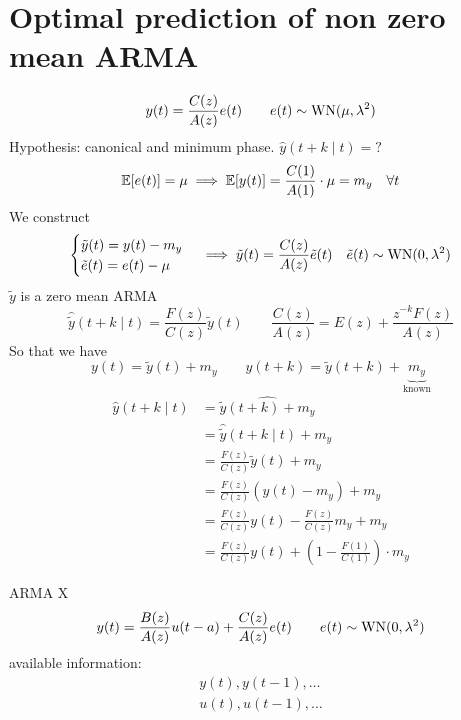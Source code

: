 \section{Optimal prediction of non zero mean ARMA}
\[
	y(t)=\frac{C(z)}{A(z)}e(t)\qquad e(t)\sim \operatorname{WN}(\mu,\lambda^2 )
\]
Hypothesis: canonical and minimum phase.
$\hat y(t+k\mid t)=?$
\[
	\mathbb{E}[e(t)]=\mu \implies \mathbb{E}[y(t)]=\frac{C(1)}{A(1)}\cdot\mu=m_{y} \quad \forall t
\]
We construct
\[
	\begin{cases}
		\tilde y(t)=y(t)-m_{y}\\
		\tilde e(t)=e(t)-\mu
	\end{cases}
	\implies 
	\tilde y(t)=\frac{C(z)}{A(z)}\tilde e(t) \quad \tilde e(t)\sim \operatorname{WN}(0,\lambda^2)
\]
$\tilde y$ is a zero mean ARMA
\[
	\hat{\tilde y} (t+k\mid t) = \frac{F(z)}{C(z)}\tilde y(t) \qquad \frac{C(z)}{A(z)}=E(z)+\frac{z^{-k}F(z) }{A(z)}
\]
So that we have
\[
	y(t)=\tilde y(t)+m_{y} \qquad y(t+k)=\tilde y(t+k)+\underbrace{m_{y}}_{\text{known}}
\]
\begin{align*}
	\hat y(t+k\mid t)&=\widehat{\tilde y(t+k)+m_{y}}\\
	&= \hat{\tilde y}(t+k\mid t)+m_{y}\\
	&=\frac{F(z)}{C(z)}\tilde y(t)+m_{y}\\
	&=\frac{F(z)}{C(z)}(y(t)-m_{y})+m_{y}\\
	&=\frac{F(z)}{C(z)}y(t)-\frac{F(z)}{C(z)}m_{y}+m_{y}\\
	&=\frac{F(z)}{C(z)}y(t)+\left( 1-\frac{F(1)}{C(1)} \right)  \cdot m_{y}
\end{align*}

ARMA X
\[
	y(t)=\frac{B(z)}{A(z)} u(t-a)+\frac{C(z)}{A(z)}e(t)\qquad e(t)\sim \operatorname{WN}(0,\lambda^2 )
\]
available information:
\begin{gather*}
	y(t),y(t-1),\ldots \\
	u(t),u(t-1),\ldots
\end{gather*}































